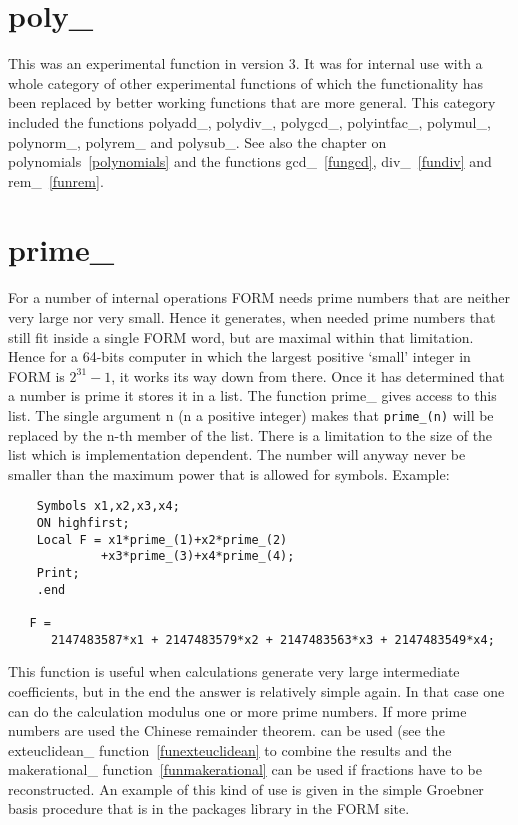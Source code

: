 \section{poly\_}
\label{funpoly}
\noindent This was an experimental function in version 3. It was for 
internal use with a whole category of other experimental functions of which 
the functionality has been replaced by better working functions that are 
more general. This category included the functions 
polyadd\_,
polydiv\_,
polygcd\_,
polyintfac\_,
polymul\_,
polynorm\_,
polyrem\_ and
polysub\_.
See also the chapter on polynomials~\ref{polynomials} and the functions 
gcd\_~\ref{fungcd}, div\_~\ref{fundiv} and rem\_~\ref{funrem}.


\section{prime\_}
\label{funprime}

\noindent For a number of internal operations FORM needs prime numbers that 
are neither very large nor very small. Hence it generates, when needed 
prime numbers that still fit inside a single FORM word, but are maximal 
within that limitation. Hence for a 64-bits computer in which the largest 
positive `small' integer in FORM is $2^{31}-1$, it works its way down from 
there. Once it has determined that a number is prime it stores it in a 
list. The function prime\_ gives access to this list. The single argument 
n (n a positive integer) makes that \verb:prime_(n): will be replaced by 
the n-th member of the list. There is a limitation to the size of the list 
which is implementation dependent. The number will anyway never be smaller 
than the maximum power that is allowed for symbols. Example:
\begin{verbatim}
    Symbols x1,x2,x3,x4;
    ON highfirst;
    Local F = x1*prime_(1)+x2*prime_(2)
             +x3*prime_(3)+x4*prime_(4);
    Print;
    .end

   F =
      2147483587*x1 + 2147483579*x2 + 2147483563*x3 + 2147483549*x4;
\end{verbatim}
This function is useful when calculations generate very large intermediate 
coefficients, but in the end the answer is relatively simple again. In that 
case one can do the calculation modulus one or more prime numbers. If more 
prime numbers are used the Chinese remainder theorem. can be used (see the exteuclidean\_ 
function~\ref{funexteuclidean} to combine the results and the 
makerational\_ function~\ref{funmakerational} can be used if fractions have 
to be reconstructed. An example of this kind of use is given in the simple 
Groebner basis procedure that is in the packages library in the FORM site.

